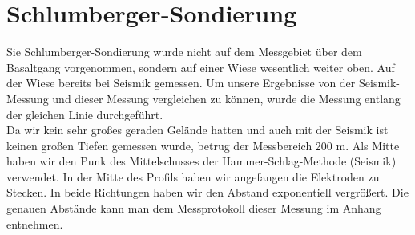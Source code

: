 \section{Schlumberger-Sondierung}
Sie Schlumberger-Sondierung wurde nicht auf dem Messgebiet über dem Basaltgang vorgenommen, sondern auf einer Wiese wesentlich weiter oben. Auf der Wiese 
bereits bei Seismik gemessen. Um unsere Ergebnisse von der Seismik-Messung und dieser Messung vergleichen zu können, wurde die Messung entlang der gleichen
Linie durchgeführt. \\
Da wir kein sehr großes geraden Gelände hatten und auch mit der Seismik ist keinen großen Tiefen gemessen wurde, betrug der Messbereich 200 m. Als Mitte 
haben wir den Punk des Mittelschusses der Hammer-Schlag-Methode (Seismik) verwendet.
In der Mitte des Profils haben wir angefangen die Elektroden zu Stecken. In beide Richtungen haben wir den Abstand exponentiell vergrößert. Die genauen Abstände kann man dem Messprotokoll dieser Messung im Anhang entnehmen.

